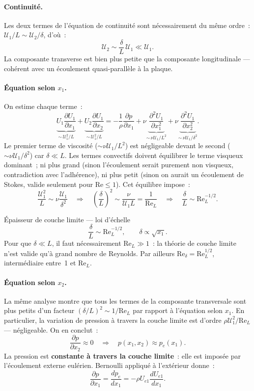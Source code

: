 \documentclass[11pt,a4paper]{report}
\newcommand{\pd}[2]{\dfrac{\partial #1}{\partial #2}}
\begin{document}
\paragraph{Continuit\'e.}
Les deux termes de l'\'equation de continuit\'e sont n\'ecessairement du m\^eme ordre~:
$\mathcal{U}_1/L \sim \mathcal{U}_2/\delta$, d'o\`u~:
\[
  \mathcal{U}_2 \sim \frac{\delta}{L}\,\mathcal{U}_1 \ll \mathcal{U}_1.
\]
La composante transverse est bien plus petite que la composante longitudinale --- coh\'erent
avec un \'ecoulement quasi-parall\`ele \`a la plaque.

\paragraph{\'Equation selon $x_1$.}
On estime chaque terme~:
\[
  \underbrace{U_1\pd{U_1}{x_1}}_{\sim\,\mathcal{U}_1^2/L}
  +\underbrace{U_2\pd{U_1}{x_2}}_{\sim\,\mathcal{U}_1^2/L}
  = -\dfrac{1}{\rho}\pd{p}{x_1}
  + \nu\!\underbrace{\pd{^2U_1}{x_1^2}}_{\sim\,\nu\mathcal{U}_1/L^2}
  + \nu\!\underbrace{\pd{^2U_1}{x_2^2}}_{\sim\,\nu\mathcal{U}_1/\delta^2}.
\]
Le premier terme de viscosit\'e ($\sim\nu\mathcal{U}_1/L^2$) est n\'egligeable devant le
second ($\sim\nu\mathcal{U}_1/\delta^2$) car $\delta \ll L$. Les termes convectifs doivent
\'equilibrer le terme visqueux dominant~; ni plus grand (sinon l'\'ecoulement serait
purement non visqueux, contradiction avec l'adh\'erence), ni plus petit (sinon on aurait
un \'ecoulement de Stokes, valide seulement pour $\mathrm{Re}\leq 1$). Cet \'equilibre
impose~:
\[
  \frac{\mathcal{U}_1^2}{L} \sim \nu\frac{\mathcal{U}_1}{\delta^2}
  \quad\Rightarrow\quad
  \left(\frac{\delta}{L}\right)^2 \sim \frac{\nu}{\mathcal{U}_1 L}
  = \frac{1}{\mathrm{Re}_L}
  \quad\Rightarrow\quad
  \boxed{\dfrac{\delta}{L} \sim \mathrm{Re}_L^{-1/2}}.
\]

\begin{importantbox}{\'Epaisseur de couche limite --- loi d'\'echelle}
\[
  \dfrac{\delta}{L} \sim \mathrm{Re}_L^{-1/2}, \qquad
  \delta \propto \sqrt{x_1}.
\]
Pour que $\delta \ll L$, il faut n\'ecessairement $\mathrm{Re}_L \gg 1$~: la th\'eorie
de couche limite n'est valide qu'\`a grand nombre de Reynolds. Par ailleurs $\mathrm{Re}_\delta
= \mathrm{Re}_L^{1/2}$, interm\'ediaire entre~1 et $\mathrm{Re}_L$.
\end{importantbox}

\paragraph{\'Equation selon $x_2$.}
La m\^eme analyse montre que tous les termes de la composante transversale sont plus petits
d'un facteur $(\delta/L)^2 \sim 1/\mathrm{Re}_L$ par rapport \`a l'\'equation selon $x_1$.
En particulier, la variation de pression \`a travers la couche limite est d'ordre
$\rho\mathcal{U}_1^2/\mathrm{Re}_L$ --- n\'egligeable. On en conclut~:
\[
  \pd{p}{x_2} \approx 0
  \quad\Rightarrow\quad
  p(x_1,x_2) \approx p_e(x_1).
\]
La pression est \textbf{constante \`a travers la couche limite}~: elle est impos\'ee par
l'\'ecoulement externe eul\'erien. Bernoulli appliqu\'e \`a l'ext\'erieur donne~:
\[
  \pd{p}{x_1} = \frac{dp_e}{dx_1} = -\rho U_{e1}\frac{dU_{e1}}{dx_1}.
\]
\end{document}
